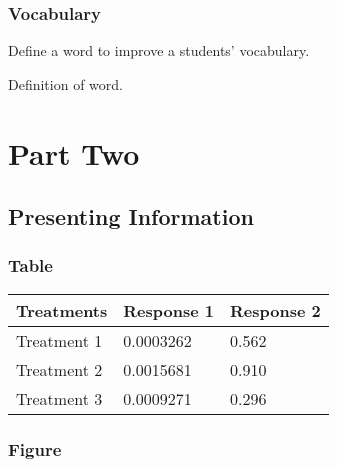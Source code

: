 \documentclass[11pt, fleqn, spanish]{book}
\begin{document}

\section{Vocabulary}

Define a word to improve a students' vocabulary.

\begin{vocabulary}[Word]
Definition of word.
\end{vocabulary}


\part{Part Two}



\chapter{Presenting Information}

\section{Table}

\centering
\begin{tabular}{l l l}
\toprule
\textbf{Treatments} & \textbf{Response 1} & \textbf{Response 2}\\
\midrule
Treatment 1 & 0.0003262 & 0.562 \\
Treatment 2 & 0.0015681 & 0.910 \\
Treatment 3 & 0.0009271 & 0.296 \\
\bottomrule
\end{tabular}


\section{Figure}
\end{document}
